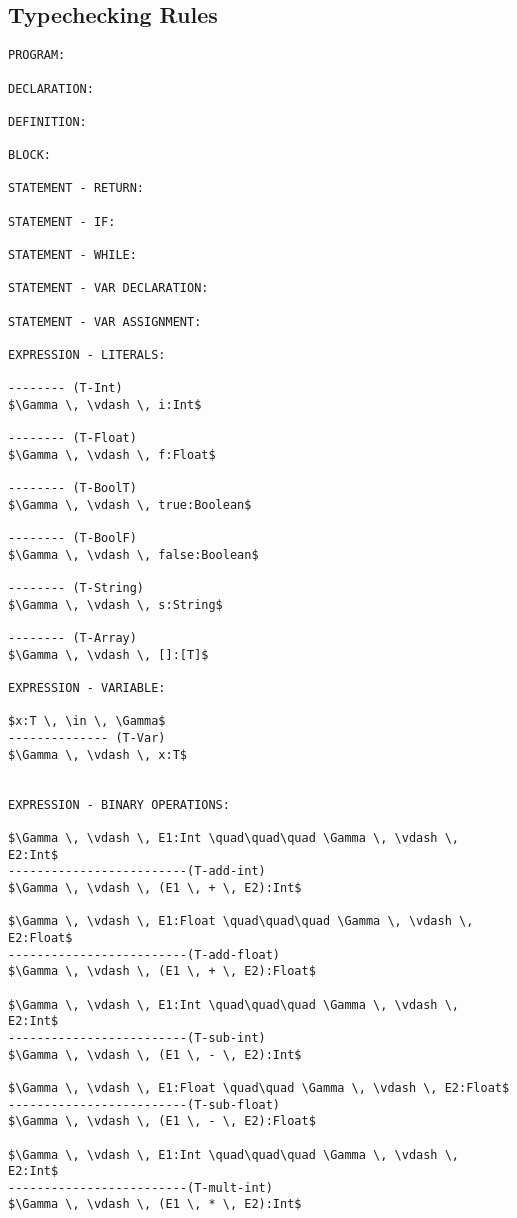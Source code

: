 \documentclass[11pt, a4paper]{article}
\begin{document}
\subsection*{Typechecking Rules}
\begin{lstlisting}
PROGRAM:

DECLARATION:

DEFINITION:

BLOCK:

STATEMENT - RETURN:

STATEMENT - IF:

STATEMENT - WHILE:

STATEMENT - VAR DECLARATION:

STATEMENT - VAR ASSIGNMENT:

EXPRESSION - LITERALS:

-------- (T-Int)
$\Gamma \, \vdash \, i:Int$

-------- (T-Float)
$\Gamma \, \vdash \, f:Float$

-------- (T-BoolT)
$\Gamma \, \vdash \, true:Boolean$

-------- (T-BoolF)
$\Gamma \, \vdash \, false:Boolean$

-------- (T-String)
$\Gamma \, \vdash \, s:String$

-------- (T-Array)
$\Gamma \, \vdash \, []:[T]$

EXPRESSION - VARIABLE:

$x:T \, \in \, \Gamma$
-------------- (T-Var)
$\Gamma \, \vdash \, x:T$


EXPRESSION - BINARY OPERATIONS:

$\Gamma \, \vdash \, E1:Int \quad\quad\quad \Gamma \, \vdash \, E2:Int$
-------------------------(T-add-int)
$\Gamma \, \vdash \, (E1 \, + \, E2):Int$

$\Gamma \, \vdash \, E1:Float \quad\quad\quad \Gamma \, \vdash \, E2:Float$
-------------------------(T-add-float)
$\Gamma \, \vdash \, (E1 \, + \, E2):Float$

$\Gamma \, \vdash \, E1:Int \quad\quad\quad \Gamma \, \vdash \, E2:Int$
-------------------------(T-sub-int)
$\Gamma \, \vdash \, (E1 \, - \, E2):Int$

$\Gamma \, \vdash \, E1:Float \quad\quad \Gamma \, \vdash \, E2:Float$
-------------------------(T-sub-float)
$\Gamma \, \vdash \, (E1 \, - \, E2):Float$

$\Gamma \, \vdash \, E1:Int \quad\quad\quad \Gamma \, \vdash \, E2:Int$
-------------------------(T-mult-int)
$\Gamma \, \vdash \, (E1 \, * \, E2):Int$


\end{lstlisting}
\end{document}
